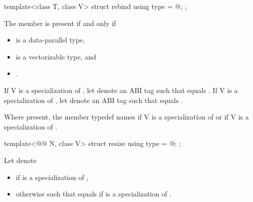 \begin{wgText}\setcounter{Paras}{3}
\begin{itemdecl}
template<class T, class V> struct rebind { using type = @\seebelow@; };
\end{itemdecl}

\begin{itemdescr}
\pnum
The member  is present if and only if
\begin{itemize}
\item {} is a data-parallel type,
\item {} is a vectorizable type, and
\item {} .
\end{itemize}

\pnum
If \tcode V is a specialization of , let  denote
an ABI tag such that  equals
.
If \tcode V is a specialization of , let 
denote an ABI tag such that  equals .

\pnum
Where present, the member typedef  names 
if \tcode V is a specialization of  or
 if \tcode V is a specialization of
.
\end{itemdescr}

\begin{itemdecl}
template<@@ N, class V> struct resize { using type = @\seebelow@; };
\end{itemdecl}

\begin{itemdescr}
\pnum
Let  denote
\begin{itemize}
 \item
    if  is a specialization of ,
 \item
   otherwise 
   {such that  equals
   } if  is a specialization of .
\end{itemize}


\end{itemdescr}
\end{wgText}
